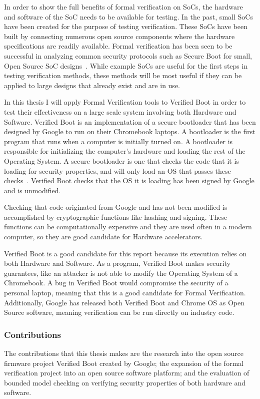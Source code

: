 \documentclass[../report.tex]{subfiles}
\begin{document}
In order to show the full benefits of formal verification on SoCs, the hardware
and software of the SoC needs to be available for testing.
In the past, small SoCs have been created for the purpose of testing verification.
These SoCs have been built by connecting numerous open source components where the hardware specifications are readily available.
Formal verification has been seen to be successful in analyzing common security protocols such as Secure Boot for small, Open Source SoC designs~\cite{elane}. 
While example SoCs are useful for the first steps in testing verification methods, these methods will be most useful if they can be applied to large designs that already exist and are in use.

In this thesis I will apply Formal Verification tools to Verified Boot in
order to test their effectiveness on a large scale system involving both
Hardware and Software.
Verified Boot is an implementation of a secure bootloader that has been designed by Google to run on their Chromebook laptops.
A bootloader is the first program that runs when a computer is initially turned
on.
A bootloader is responsible for initializing the computer's hardware and
loading the rest of the Operating System.
A secure bootloader is one that checks the code that it is loading for security
properties, and will only load an OS that passes these checks~\cite{secure-bootloader}.
Verified Boot checks that the OS it is loading has been signed by Google and is
unmodified.

Checking that code originated from Google and has not been modified is
accomplished by cryptographic functions like hashing and signing.
These functions can be computationally expensive and they are used often in a
modern computer, so they are good candidate for Hardware accelerators.  

Verified Boot is a good candidate for this report because its execution relies
on both Hardware and Software.
As a program, Verified Boot makes security guarantees, like an attacker is not
able to modify the Operating System of a Chromebook. 
A bug in Verified Boot would compromise the security of a personal laptop,
meaning that this is a good candidate for Formal Verification.
Additionally, Google has released both Verified Boot and Chrome OS as Open
Source software, meaning verification can be run directly on industry code.
\subsubsection{Contributions}

The contributions that this thesis makes are the research into the open source firmware project Verified Boot created by Google; the expansion of the formal verification project into an open source software platform; and the evaluation of bounded model checking on verifying security properties of both hardware and software.

\end{document}
